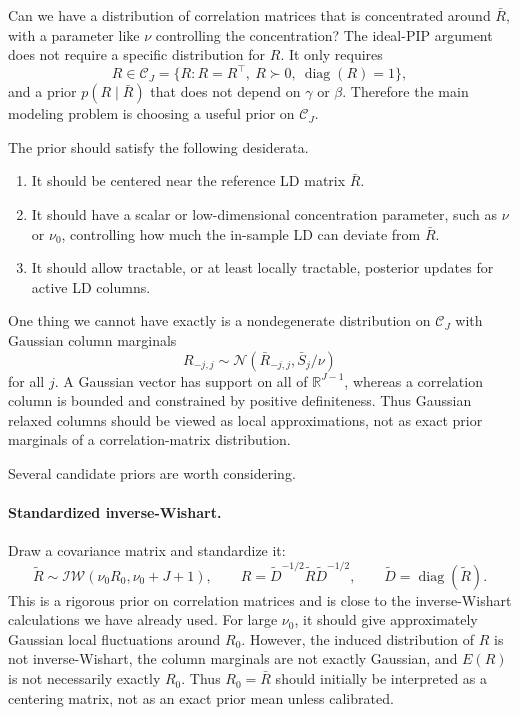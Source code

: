 \documentclass[11pt]{article}
\newcommand{\Rbar}{\bar R}
\newcommand{\Normal}{\mathcal N}
\newcommand{\diag}{\operatorname{diag}}
\begin{document}
Can we have a distribution of correlation matrices that is concentrated around
\(\Rbar\), with a parameter like \(\nu\) controlling the concentration? The
ideal-PIP argument does not require a specific distribution for \(R\). It only
requires
\[
R\in\mathcal C_J
=
\{R:R=R^\top,\ R\succ0,\ \diag(R)=1\},
\]
and a prior \(p(R\mid\Rbar)\) that does not depend on \(\gamma\) or \(\beta\).
Therefore the main modeling problem is choosing a useful prior on
\(\mathcal C_J\).

The prior should satisfy the following desiderata.
\begin{enumerate}[leftmargin=*]
\item It should be centered near the reference LD matrix \(\Rbar\).
\item It should have a scalar or low-dimensional concentration parameter,
such as \(\nu\) or \(\nu_0\), controlling how much the in-sample LD can deviate
from \(\Rbar\).
\item It should allow tractable, or at least locally tractable, posterior
updates for active LD columns.
\end{enumerate}

One thing we cannot have exactly is a nondegenerate distribution on
\(\mathcal C_J\) with Gaussian column marginals
\[
R_{-j,j}\sim
\Normal(\Rbar_{-j,j},\bar S_j/\nu)
\]
for all \(j\). A Gaussian vector has support on all of
\(\mathbb R^{J-1}\), whereas a correlation column is bounded and constrained
by positive definiteness. Thus Gaussian relaxed columns should be viewed as
local approximations, not as exact prior marginals of a correlation-matrix
distribution.

Several candidate priors are worth considering.

\paragraph{Standardized inverse-Wishart.}
Draw a covariance matrix and standardize it:
\[
\tilde R\sim \mathcal{IW}(\nu_0R_0,\nu_0+J+1),
\qquad
R=\tilde D^{-1/2}\tilde R\tilde D^{-1/2},
\qquad
\tilde D=\diag(\tilde R).
\]
This is a rigorous prior on correlation matrices and is close to the
inverse-Wishart calculations we have already used. For large \(\nu_0\), it
should give approximately Gaussian local fluctuations around \(R_0\). However,
the induced distribution of \(R\) is not inverse-Wishart, the column marginals
are not exactly Gaussian, and \(E(R)\) is not necessarily exactly \(R_0\).
Thus \(R_0=\Rbar\) should initially be interpreted as a centering matrix, not
as an exact prior mean unless calibrated.
\end{document}

